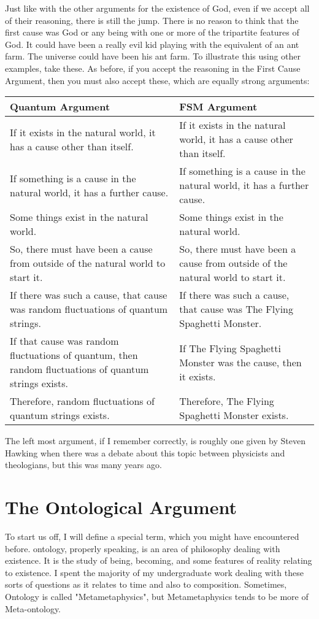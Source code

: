 Just like with the other arguments for the existence of God, even if we accept all of their reasoning, there is still the jump. There is no reason to think that the first cause was God or any being with one or more of the tripartite features of God. It could have been a really evil kid playing with the equivalent of an ant farm. The universe could have been his ant farm. To illustrate this using other examples, take these. As before, if you accept the reasoning in the First Cause Argument, then you must also accept these, which are equally strong arguments:
\noindent
\begin{tabular}{p{2.75in}|p{2.75in}}
Quantum Argument&FSM Argument\\\hline
    If it exists in the natural world, it has a cause other than itself.&If it exists in the natural world, it has a cause other than itself.\\
    If something is a cause in the natural world, it has a further cause.&    If something is a cause in the natural world, it has a further cause.\\
    Some things exist in the natural world.&Some things exist in the natural world.\\
    So, there must have been a cause from outside of the natural world to start it.&So, there must have been a cause from outside of the natural world to start it.\\
    If there was such a cause, that cause was random fluctuations of quantum strings.&    If there was such a cause, that cause was The Flying Spaghetti Monster.\\
    If that cause was random fluctuations of quantum, then random fluctuations of quantum strings exists.& If The Flying Spaghetti Monster was the cause, then it exists.\\
    Therefore, random fluctuations of quantum strings exists.&Therefore, The Flying Spaghetti Monster exists.\\
\end{tabular}

The left most argument, if I remember correctly, is roughly one given by Steven Hawking when there was a debate about this topic between physicists and theologians, but this was many years ago.

\section{The Ontological Argument}
To start us off, I will define a special term, which you might have encountered before. \Gls{ontology}, properly speaking, is an area of philosophy dealing with existence. It is the study of being, becoming, and some features of reality relating to existence.  I spent the majority of my undergraduate work dealing with these sorts of questions as it relates to time and also to composition. Sometimes, Ontology is called "Metametaphysics", but Metametaphysics tends to be more of Meta-ontology.  

